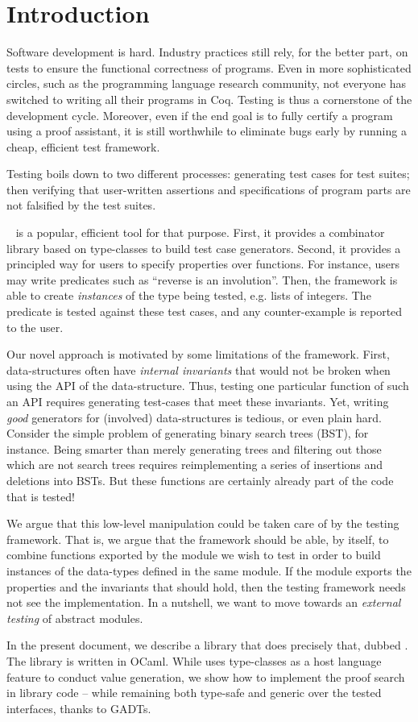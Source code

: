 \section{Introduction}
\label{sec:introduction}

Software development is hard. Industry practices still rely, for the better
part, on tests to ensure the functional correctness of programs. Even in more
sophisticated circles, such as the programming language research community, not
everyone has switched to writing all their programs in Coq. Testing is thus a
cornerstone of the development cycle. Moreover, even if the end goal is to fully
certify a program using a proof assistant, it is still worthwhile to eliminate
bugs early by running a cheap, efficient test framework.

Testing boils down to two different processes: generating test cases
for test suites; then verifying that user-written assertions and
specifications of program parts are not falsified by the test suites.

\qcheck{}~\cite{DBLP:conf/icfp/ClaessenH00} is a popular, efficient
tool for that purpose. First, it provides a combinator library based
on type-classes to build test case generators. Second, it provides
a principled way for users to specify properties over
functions. For instance, users may write predicates such as ``reverse
is an involution''. Then, the \qcheck framework is able to create
\emph{instances} of the type being tested, e.g. lists of integers.
The predicate is tested against these test cases, and any
counter-example is reported to the user.

Our novel approach is motivated by some limitations of the \qcheck
framework.
%
First, data-structures often have \emph{internal invariants} that
would not be broken when using the API of the data-structure. Thus,
testing one particular function of such an API requires generating
test-cases that meet these invariants.
%
Yet, writing \emph{good} generators for (involved) data-structures is
tedious, or even plain hard. Consider the simple problem of generating
binary search trees (BST), for instance. Being smarter than merely
generating trees and filtering out those which are not
search trees requires reimplementing a series of insertions and
deletions into BSTs. But these functions are certainly already
part of the code that is tested!
%

We argue that this low-level manipulation could be taken care of by
the testing framework. That is, we argue that the framework should be
able, by itself, to combine functions exported by the module we wish
to test in order to build instances of the data-types defined in the
same module. If the module exports the properties and the invariants
that should hold, then the testing framework needs not see the
implementation.
%
In a nutshell, we want to move towards an \emph{external testing} of abstract
modules.

In the present document, we describe a library that does precisely
that, dubbed \arti. The library is written in OCaml. While \qcheck
uses type-classes as a host language feature to conduct value
generation, we show how to implement the proof search in library
code -- while remaining both type-safe and generic over the
tested interfaces, thanks to GADTs.
